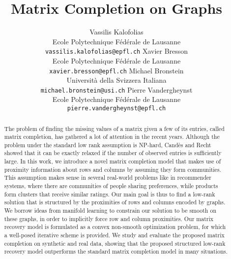 \documentclass{article}
\title{Matrix Completion on Graphs}
\author{
Vassilis Kalofolias\\
Ecole Polytechnique F\'ed\'erale de Lausanne\\
\texttt{vassilis.kalofolias@epfl.ch}
\And
Xavier Bresson\\
Ecole Polytechnique F\'ed\'erale de Lausanne\\
\texttt{xavier.bresson@epfl.ch}
\And
Michael Bronstein\\
Universit\`a della Svizzera Italiana\\
\texttt{michael.bronstein@usi.ch}
\And
Pierre Vandergheynst\\
Ecole Polytechnique F\'ed\'erale de Lausanne\\
\texttt{pierre.vandergheynst@epfl.ch}
}
\begin{document}
\maketitle




\begin{abstract}
\vspace{-0.15cm}
The problem of finding the missing values of a matrix given a few of its entries, called matrix completion, has gathered a lot of attention in the recent years. Although the problem under the standard low rank assumption is NP-hard, Cand\`es and Recht showed that it can be exactly relaxed if the number of observed entries is sufficiently large. In this work, we introduce a novel matrix completion model that makes use of proximity information about rows and columns by assuming they form communities. This assumption makes sense in several real-world problems like in recommender systems, where there are communities of people sharing preferences, while products form clusters that receive similar ratings. Our main goal is thus to find a low-rank solution that is structured by the proximities of rows and columns encoded by graphs. We borrow ideas from manifold learning to constrain our solution to be smooth on these graphs, in order to implicitly force row and column proximities. Our matrix recovery model is formulated as a convex non-smooth optimization problem, for which a well-posed iterative scheme is provided. We study and evaluate the proposed matrix completion on synthetic and real data, showing that the proposed structured low-rank recovery model outperforms  the standard matrix completion model in many situations.
\end{abstract}



\vspace{-0.1cm}
\end{document}
